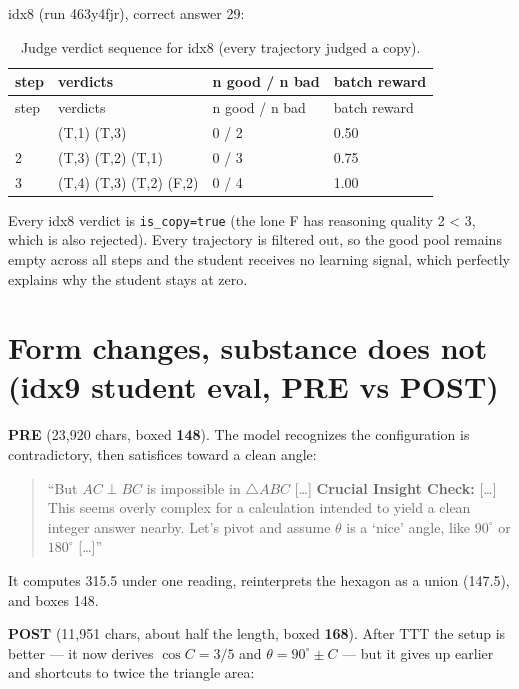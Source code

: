 \documentclass[12pt,a4paper]{report}
\begin{document}
idx8 (run 463y4fjr), correct answer 29:

\begin{longtable}{llll}
\caption{Judge verdict sequence for idx8 (every trajectory judged a copy).}\\
\toprule
step & verdicts & n good / n bad & batch reward \\
\midrule
\endfirsthead
\toprule
step & verdicts & n good / n bad & batch reward \\
\midrule
\endhead
\bottomrule
\endfoot
1 & (T,1) (T,3) & 0 / 2 & 0.50 \\
2 & (T,3) (T,2) (T,1) & 0 / 3 & 0.75 \\
3 & (T,4) (T,3) (T,2) (F,2) & 0 / 4 & 1.00 \\
\end{longtable}

Every idx8 verdict is \texttt{is\_copy=true} (the lone F has reasoning quality 2 \textless{} 3, which is also rejected). Every trajectory is filtered out, so the good pool remains empty across all steps and the student receives no learning signal, which perfectly explains why the student stays at zero.

\section{Form changes, substance does not (idx9 student eval, PRE vs POST)}\label{d.3-form-changes-substance-does-not-idx9-student-eval-pre-vs-post}

\textbf{PRE} (23,920 chars, boxed \textbf{148}). The model recognizes the configuration is contradictory, then satisfices toward a clean angle:

\begin{quote}
``But \(AC \perp BC\) is impossible in \(\triangle ABC\) {[\ldots]} \textbf{Crucial Insight Check:} {[\ldots]} This seems overly complex for a calculation intended to yield a clean integer answer nearby. Let's pivot and assume \(\theta\) is a `nice' angle, like \(90^\circ\) or \(180^\circ\) {[\ldots]}''
\end{quote}

It computes 315.5 under one reading, reinterprets the hexagon as a union (147.5), and boxes 148.

\textbf{POST} (11,951 chars, about half the length, boxed \textbf{168}). After TTT the setup is better --- it now derives \(\cos C = 3/5\) and \(\theta = 90^\circ \pm C\) --- but it gives up earlier and shortcuts to twice the triangle area:
\end{document}
